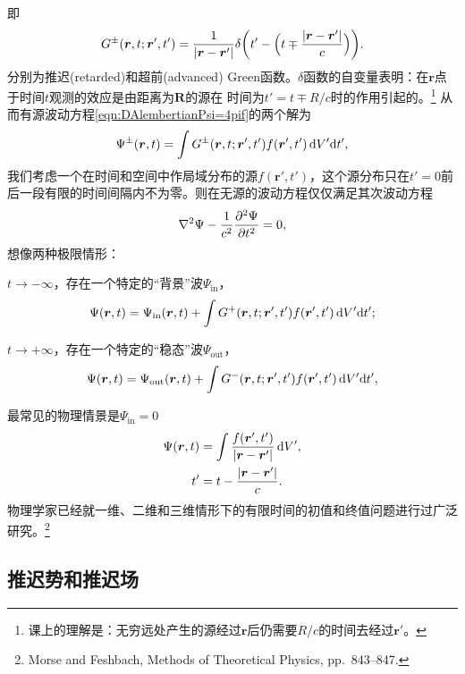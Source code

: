 即
\begin{equation}
    G^\pm(\bm r,t;\bm r',t') = \frac1{\abs{\bm r - \bm r'}}\delta\biggp{t' - \Bigp{t \mp \frac{\abs{\bm r - \bm r'}}c}}.
\end{equation}
分别为推迟(retarded)和超前(advanced) Green函数。$\delta$函数的自变量表明：在$\bm r$点于时间$t$观测的效应是由距离为$\bm R$的源在%
时间为$t' = t \mp R/c$时的作用引起的。\footnote{课上的理解是：无穷远处产生的源经过$\bm r$后仍需要$R/c$的时间去经过$\bm r'$。}
从而有源波动方程\eqref{eqn:DAlembertianPsi=4pif}的两个解为 
\[
    \Psi^\pm(\bm r,t) = \int G^\pm(\bm r,t;\bm r',t')f(\bm r',t')\d V'\nd t',
\]
我们考虑一个在时间和空间中作局域分布的源$f(\bm r',t')$，这个源分布只在$t' = 0$前后一段有限的时间间隔内不为零。则在无源的波动方程仅仅满足其次波动方程
\[
    \laplacian\Psi - \frac1{c^2}\pv[2]\Psi t = 0,
\]
想像两种极限情形：
\begin{compactenum}
	\item $t \to -\infty$，存在一个特定的“背景”波$\Psi_\text{in}$，
	\begin{equation}
	    \label{eq:ed-incoming-retarded-decomposition}
        \Psi(\bm r,t) = \Psi_\text{in}(\bm r,t) + \int G^+(\bm r,t;\bm r',t')f(\bm r',t')\d V'\nd t';
    \end{equation}
	\item $t \to +\infty$，存在一个特定的“稳态”波$\Psi_\text{out}$，
	\begin{equation}
	    \label{eq:ed-outgoing-advanced-decomposition}
        \Psi(\bm r,t) = \Psi_\text{out}(\bm r,t) + \int G^-(\bm r,t;\bm r',t')f(\bm r',t')\d V'\nd t',
    \end{equation}
\end{compactenum}
最常见的物理情景是$\Psi_\text{in} = 0$%
\begin{subequations}
    \begin{align}
        \Psi(\bm r,t) &= \int\frac{f(\bm r',t')}{\abs{\bm r - \bm r'}}\d V',\\
        t' &= t - \frac{\abs{\bm r - \bm r'}}c.
    \end{align}
\end{subequations}
物理学家已经就一维、二维和三维情形下的有限时间的初值和终值问题进行过广泛研究。\footnote{Morse and Feshbach, Methods of Theoretical Physics, pp.~843--847.}

\subsection{推迟势和推迟场}


